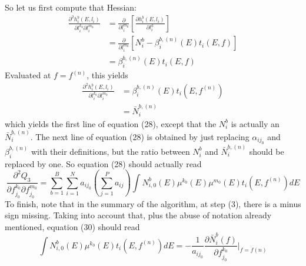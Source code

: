 \documentclass[a4paper, 10pt]{article}
\begin{document}
So let us first compute that Hessian:
\begin{equation*}
\begin{split}
  \frac{\partial^2 h_i^b(E, l_i)}{\partial l_i^{k_0}\partial l_i^{m_0}} &= \frac{\partial}{\partial l_i^{m_0}} \left[ \frac{\partial h_i^b(E, l_i)}{\partial l_i^{k}} \right] \\
   &= \frac{\partial}{\partial l_i^{m_0}} \left[  N_i^b - \beta_i^{b, (n)}(E)t_i(E,f) \right] \\
   &= \beta_i^{b, (n)}(E)t_i(E,f)
\end{split}
\end{equation*}
Evaluated at $f=f^{(n)}$, this yields
\begin{equation*}
\begin{split}
  \frac{\partial^2 h_i^b(E, l_i)}{\partial l_i^{k_0}\partial l_i^{m_0}} &= \beta_i^{b, (n)}(E)t_i(E,f^{(n)}) \\
  &= \bar{N}_i^{b, (n)}
  \end{split}
\end{equation*}
which yields the first line of equation (28), except that the $N_i^b$ is actually an $\bar{N}_i^{b, (n)}$.
The next line of equation (28) is obtained by just replacing $\alpha_{ij_0}$ and $\beta_i^{b, (n)}$ with their definitions, but the ratio between $N_i^b$ and $\bar{N}_i^{b, (n)}$ should be replaced by one. So equation (28) should actually read
\begin{equation*}
  \frac{\partial^2 Q_3}{\partial f_{j_0}^{k_0}\partial f_{j_0}^{m_0}} =  \sum_{b=1}^B \sum_{i=1}^N a_{ij_0} \left( \sum_{j=1}^P a_{ij} \right) \int N_{i, 0}^b(E) \mu^{k_0}(E) \mu^{m_0}(E) t_i(E, f^{(n)}) dE
\end{equation*}
To finish, note that in the summary of the algorithm, at step (3), there is a minus sign missing. Taking into account that, plus the abuse of notation already mentioned, equation (30) should read
\begin{equation*}
  \int N_{i, 0}^b(E) \mu^{k_0}(E) t_i(E, f^{(n)}) dE = - \frac{1}{a_{ij_0}} \frac{\partial \bar{N}_i^{b}(f)}{\partial f_{j_0}^{k_0}}\Bigr|_{f = f{(n)}}
\end{equation*}
\end{document}
